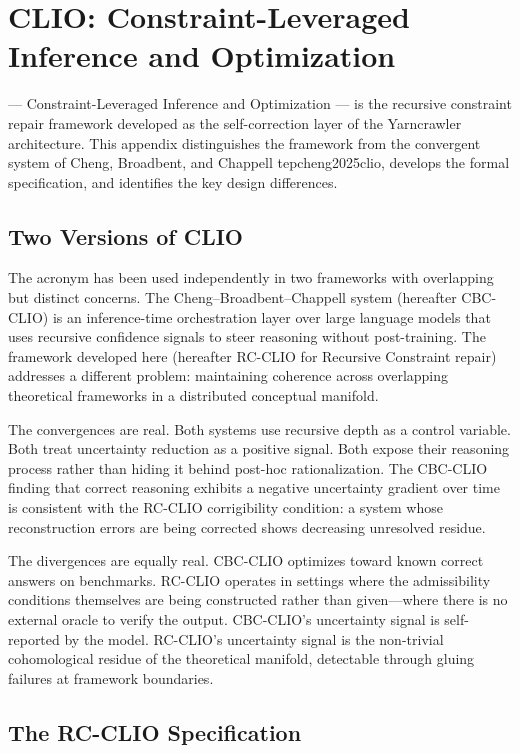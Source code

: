 \chapter{CLIO: Constraint-Leveraged Inference and Optimization}
\label{app:clio}

\noindent \CLIO --- Constraint-Leveraged Inference and Optimization --- is the
recursive constraint repair framework developed as the self-correction layer of
the Yarncrawler architecture. This appendix distinguishes the framework from the
convergent system of Cheng, Broadbent, and Chappell 	tep{cheng2025clio}, develops the formal
specification, and identifies the key design differences.

\section{Two Versions of CLIO}

The acronym \CLIO has been used independently in two frameworks with overlapping
but distinct concerns. The Cheng--Broadbent--Chappell system (hereafter
CBC-CLIO) is an inference-time orchestration layer over large language models
that uses recursive confidence signals to steer reasoning without post-training.
The framework developed here (hereafter RC-CLIO for Recursive Constraint repair)
addresses a different problem: maintaining coherence across overlapping theoretical
frameworks in a distributed conceptual manifold.

The convergences are real. Both systems use recursive depth as a control variable.
Both treat uncertainty reduction as a positive signal. Both expose their reasoning
process rather than hiding it behind post-hoc rationalization. The CBC-CLIO
finding that correct reasoning exhibits a negative uncertainty gradient over time
is consistent with the RC-CLIO corrigibility condition: a system whose
reconstruction errors are being corrected shows decreasing unresolved residue.

The divergences are equally real. CBC-CLIO optimizes toward known correct answers
on benchmarks. RC-CLIO operates in settings where the admissibility conditions
themselves are being constructed rather than given---where there is no external
oracle to verify the output. CBC-CLIO's uncertainty signal is self-reported by
the model. RC-CLIO's uncertainty signal is the non-trivial cohomological residue
of the theoretical manifold, detectable through gluing failures at framework
boundaries.

\section{The RC-CLIO Specification}

